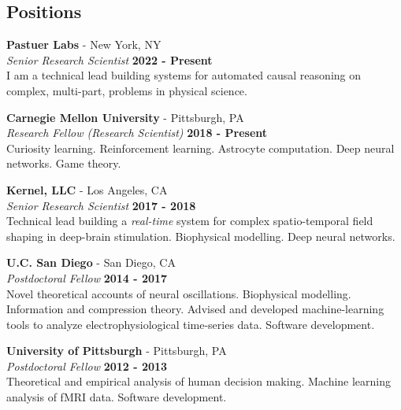 \documentclass[margin,line]{res}
\begin{document}
\begin{resume}






\section{\sc Positions}
{\bf Pastuer Labs} - New York, NY\\
{\em Senior Research Scientist} \hfill {\bf 2022 - Present}\\
I am a technical lead building systems for automated causal reasoning on complex, multi-part, problems in physical science. 

{\bf Carnegie Mellon University} - Pittsburgh, PA \\
{\em Research Fellow (Research Scientist)} \hfill {\bf 2018 - Present}\\
Curiosity learning. Reinforcement learning. Astrocyte computation. Deep neural networks. Game theory.

{\bf Kernel, LLC} - Los Angeles, CA\\
{\em Senior Research Scientist} \hfill {\bf 2017 - 2018}\\
Technical lead building a \emph{real-time} system for complex spatio-temporal field shaping in deep-brain stimulation. Biophysical modelling. Deep neural networks.

{\bf U.C. San Diego} - San Diego, CA\\
{\em Postdoctoral Fellow} \hfill {\bf 2014 - 2017}\\
Novel theoretical accounts of neural oscillations. Biophysical modelling. Information and compression theory. Advised and developed machine-learning tools to analyze electrophysiological time-series data. Software development.

{\bf University of Pittsburgh} - Pittsburgh, PA\\
{\em Postdoctoral Fellow} \hfill {\bf 2012 - 2013}\\
Theoretical and empirical analysis of human decision making. Machine learning analysis of fMRI data. Software development.


\end{resume}
\end{document}
